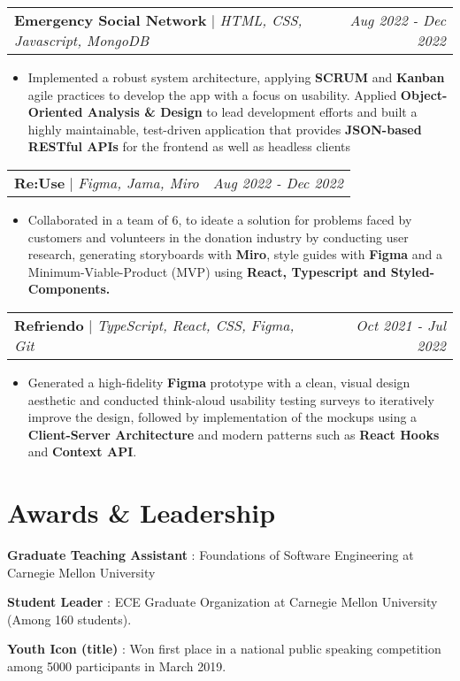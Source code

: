 \documentclass[letterpaper]{article}
\makeatletter
\newcommand{\resumeItemWithoutTitle}[1]{
  \item\small{
    {#1 \vspace{-3pt}}
  }
}
\newcommand{\shortSection}[1]{
    \vspace{-6pt}
    \section{#1}
}
\newcommand{\projectHeading}[3]{
  \begin{tabular*}{\textwidth}{l@{\extracolsep{\fill}}r}
        \textbf{#1} 
        \hspace{-2pt} $\vert$ \hspace{-2pt} \small{\textit{#2}} 
        & 
        \textit{#3} \\
    \end{tabular*}\vspace{-2pt}
}
\newcommand*{\skill}[2]{
  \textbf{#1} : #2 \\
  \vspace{2pt}
}
\newcommand{\resumeItemListStart}{\begin{itemize}}
\newcommand{\resumeItemListEnd}{\end{itemize}}
\makeatother
\begin{document}
\vspace{4pt}
\projectHeading {Emergency Social Network}{HTML, CSS, Javascript, MongoDB}{Aug 2022 - Dec 2022}
\resumeItemListStart
\resumeItemWithoutTitle{Implemented a robust system architecture, applying \textbf{SCRUM} and \textbf{Kanban} agile practices to develop the app with a focus on usability. Applied \textbf{Object-Oriented Analysis \& Design} to lead development efforts and built a highly maintainable, test-driven application that provides \textbf{JSON-based RESTful APIs} for the frontend as well as headless clients}
\resumeItemListEnd

\vspace{4pt}
\projectHeading {Re:Use}{Figma, Jama, Miro}{Aug 2022 - Dec 2022}
\resumeItemListStart
\resumeItemWithoutTitle{Collaborated in a team of 6, to ideate a solution for problems faced by customers and volunteers in the donation industry by conducting user research, generating storyboards with \textbf{Miro}, style guides with \textbf{Figma} and a Minimum-Viable-Product (MVP) using \textbf{React, Typescript and Styled-Components.}}
\resumeItemListEnd

\vspace{4pt}
\projectHeading {Refriendo}{TypeScript, React, CSS, Figma, Git}{Oct 2021 - Jul 2022}
\resumeItemListStart
\resumeItemWithoutTitle{Generated a high-fidelity \textbf{Figma} prototype with a clean, visual design aesthetic and conducted think-aloud usability testing surveys to iteratively improve the design, followed by implementation of the mockups using a \textbf{Client-Server Architecture} and modern patterns such as \textbf{React Hooks} and \textbf{Context API}.}
\resumeItemListEnd

\shortSection{Awards \& Leadership}
\skill {Graduate Teaching Assistant}{Foundations of Software Engineering at Carnegie Mellon University}
\skill {Student Leader}{ ECE Graduate Organization at Carnegie Mellon University (Among 160 students).}
\skill {Youth Icon (title)}{Won first place in a national public speaking competition among 5000 participants in March 2019.}
\end{document}
